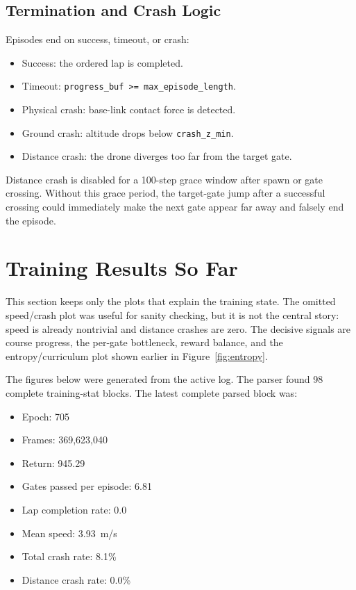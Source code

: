 \documentclass[11pt]{article}
\begin{document}
\subsection{Termination and Crash Logic}

Episodes end on success, timeout, or crash:

\begin{itemize}
  \item Success: the ordered lap is completed.
  \item Timeout: \texttt{progress\_buf >= max\_episode\_length}.
  \item Physical crash: base-link contact force is detected.
  \item Ground crash: altitude drops below \texttt{crash\_z\_min}.
  \item Distance crash: the drone diverges too far from the target gate.
\end{itemize}

Distance crash is disabled for a 100-step grace window after spawn or gate
crossing. Without this grace period, the target-gate jump after a successful
crossing could immediately make the next gate appear far away and falsely end
the episode.

\section{Training Results So Far}

This section keeps only the plots that explain the training state. The omitted
speed/crash plot was useful for sanity checking, but it is not the central
story: speed is already nontrivial and distance crashes are zero. The decisive
signals are course progress, the per-gate bottleneck, reward balance, and the
entropy/curriculum plot shown earlier in Figure~\ref{fig:entropy}.

The figures below were generated from the active log. The parser found 98
complete training-stat blocks. The latest complete parsed block was:

\begin{itemize}
  \item Epoch: 705
  \item Frames: 369,623,040
  \item Return: 945.29
  \item Gates passed per episode: 6.81
  \item Lap completion rate: 0.0
  \item Mean speed: \SI{3.93}{m/s}
  \item Total crash rate: 8.1\%
  \item Distance crash rate: 0.0\%
\end{itemize}
\end{document}
